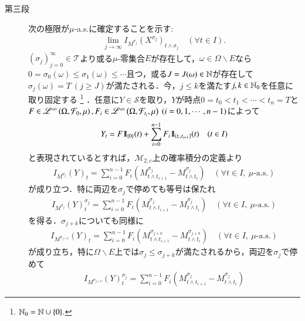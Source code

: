 \begin{prf}
\begin{description}
			\item[第三段]
				次の極限が$\mu$-a.s.に確定することを示す:
				\begin{align}
					\lim_{j \to \infty} I_{M^{\sigma_j}}(X^{\sigma_j})_{t \wedge \sigma_j}
					\quad (\forall t \in I).
				\end{align}
				$(\sigma_j)_{j=0}^{\infty} \in \mathcal{T}$より或る$\mu$-零集合$E$が存在して，$\omega \in \Omega \backslash E$なら
				$0 = \sigma_0(\omega) \leq \sigma_1(\omega) \leq \cdots$且つ，或る$J = J(\omega) \in \mathbb{N}$が存在して
				$\sigma_j(\omega) = T\ (j \geq J)$が満たされる．今，$j \leq k$を満たす$j,k \in \mathbb{N}_0$を任意に取り固定する
				\footnote{
					$\mathbb{N}_0 = \mathbb{N} \cup \{0\}.$
				}
				．任意に$Y \in \mathcal{S}$を取り，$Y$が時点$0=t_0 < t_1 < \cdots < t_n = T$と
				$F \in \semiLp{\infty}{\Omega,\mathcal{F}_0,\mu},F_i \in \semiLp{\infty}{\Omega,\mathcal{F}_{t_i},\mu}\ (i=0,1,\cdots,n-1)$によって
				\begin{align}
					Y_t = F \mbox{1}\hspace{-0.25em}\mbox{l}_{\{0\}}(t) + \sum_{i=0}^{n-1} F_i \mbox{1}\hspace{-0.25em}\mbox{l}_{\left(t_i,t_{i+1}\right]}(t)
					\quad (t \in I)
				\end{align}
				と表現されているとすれば，$\mathcal{M}_{2,c}$上の確率積分の定義より
				\begin{align}
					I_{M^{\sigma_j}}(Y)_t = \sum_{i=0}^{n-1} F_i \left( M^{\sigma_j}_{t \wedge t_{i+1}} - M^{\sigma_j}_{t \wedge t_i} \right)
					\quad (\forall t \in I,\ \mbox{$\mu$-a.s.})
				\end{align}
				が成り立つ．特に両辺を$\sigma_j$で停めても等号は保たれ
				\begin{align}
					I_{M^{\sigma_j}}(Y)^{\sigma_j}_t = \sum_{i=0}^{n-1} F_i \left( M^{\sigma_j}_{t \wedge t_{i+1}} - M^{\sigma_j}_{t \wedge t_i} \right)
					\quad (\forall t \in I,\ \mbox{$\mu$-a.s.})
					\label{eq:thm_Ito_integral_on_M_c_loc_and_left_cont_locally_bounded_1}
				\end{align}
				を得る．$\sigma_{j+k}$についても同様に
				\begin{align}
					I_{M^{\sigma_{j+k}}}(Y)_t = \sum_{i=0}^{n-1} F_i \left( M^{\sigma_{j+k}}_{t \wedge t_{i+1}} - M^{\sigma_{j+k}}_{t \wedge t_i} \right)
					\quad (\forall t \in I,\ \mbox{$\mu$-a.s.})
				\end{align}
				が成り立ち，特に$\Omega \backslash E$上では$\sigma_j \leq \sigma_{j+k}$が満たされるから，両辺を$\sigma_j$で停めて
				\begin{align}
					I_{M^{\sigma_{j+k}}}(Y)^{\sigma_j}_t = \sum_{i=0}^{n-1} F_i \left( M^{\sigma_j}_{t \wedge t_{i+1}} - M^{\sigma_j}_{t \wedge t_i} \right)

\end{align}
\end{description}
\end{prf}
